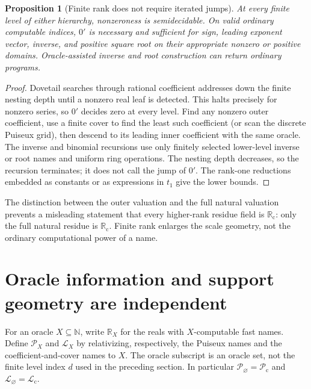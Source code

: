 \documentclass[11pt,letterpaper]{article}
\numberwithin{equation}{section}
\newtheorem{proposition}[theorem]{Proposition}
\theoremstyle{definition}
\theoremstyle{remark}
\newcommand{\Rc}{\mathbb R_{\mathrm c}}
\newcommand{\Lc}{\mathcal L_{\mathrm c}}
\newcommand{\Pc}{\mathcal P_{\mathrm c}}
\newcommand{\R}{\mathbb R}
\newcommand{\N}{\mathbb N}
\begin{document}
\begin{proposition}[Finite rank does not require iterated jumps]
\label{prop:tower-jump}
At every finite level of either hierarchy, nonzeroness is semidecidable.
On valid ordinary computable indices, $0'$ is necessary and sufficient for
sign, leading exponent vector, inverse, and positive square root on their
appropriate nonzero or positive domains. Oracle-assisted inverse and root
construction can return ordinary programs.
\end{proposition}
\begin{proof}
Dovetail searches through rational coefficient addresses down the finite
nesting depth until a nonzero real leaf is detected. This halts precisely
for nonzero series, so $0'$ decides zero at every level. Find any nonzero
outer coefficient, use a finite cover to find the least such coefficient
(or scan the discrete Puiseux grid), then descend to its leading inner
coefficient with the same oracle. The inverse and binomial recursions use
only finitely selected lower-level inverse or root names and uniform ring
operations. The nesting depth decreases, so the recursion terminates; it
does not call the jump of $0'$. The rank-one reductions embedded as constants
or as expressions in $t_1$ give the lower bounds.
\end{proof}
The distinction between the outer valuation and the full natural valuation
prevents a misleading statement that every higher-rank residue field is
$\Rc$: only the full natural residue is $\Rc$. Finite rank enlarges the
scale geometry, not the ordinary computational power of a name.

\section{Oracle information and support geometry are independent}
\label{sec:oracle-hierarchy}
For an oracle $X\subseteq\N$, write $\R_X$ for the reals with $X$-computable
fast names. Define $\mathcal P_X$ and $\mathcal L_X$ by relativizing,
respectively, the Puiseux names and the coefficient-and-cover names to $X$.
The oracle subscript is an oracle set, not the finite level index $d$ used
in the preceding section. In particular $\mathcal P_{\varnothing}=\Pc$ and
$\mathcal L_{\varnothing}=\Lc$.
\end{document}
